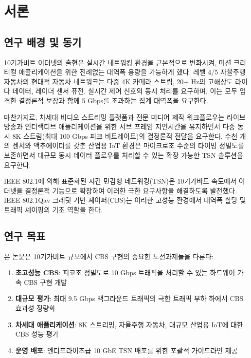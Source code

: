 \documentclass[12pt, a4paper]{article}
\begin{document}
\tableofcontents

\newpage

\section{서론}

\subsection{연구 배경 및 동기}

10기가비트 이더넷의 출현은 실시간 네트워킹 환경을 근본적으로 변화시켜, 미션 크리티컬 애플리케이션을 위한 전례없는 대역폭 용량을 가능하게 했다. 레벨 4/5 자율주행 자동차의 현대적 자동차 네트워크는 다중 4K 카메라 스트림, 20+ Hz의 고해상도 라이다 데이터, 레이더 센서 퓨전, 실시간 제어 신호의 동시 처리를 요구하며, 이는 모두 엄격한 결정론적 보장과 함께 5 Gbps를 초과하는 집계 대역폭을 요구한다.

마찬가지로, 차세대 비디오 스트리밍 플랫폼과 전문 미디어 제작 워크플로우는 라이브 방송과 인터랙티브 애플리케이션을 위한 서브 프레임 지연시간을 유지하면서 다중 동시 8K 스트림(최대 100 Gbps 피크 비트레이트)의 결정론적 전달을 요구한다. 수천 개의 센서와 액추에이터를 갖춘 산업용 IoT 환경은 마이크로초 수준의 타이밍 정밀도를 보존하면서 대규모 동시 데이터 플로우를 처리할 수 있는 확장 가능한 TSN 솔루션을 요구한다.

IEEE 802.1에 의해 표준화된 시간 민감형 네트워킹(TSN)은 10기가비트 속도에서 이더넷을 결정론적 기능으로 확장하여 이러한 극한 요구사항을 해결하도록 발전했다. IEEE 802.1Qav 크레딧 기반 셰이퍼(CBS)는 이러한 고성능 환경에서 대역폭 할당 및 트래픽 셰이핑의 기초 역할을 한다.

\subsection{연구 목표}

본 논문은 10기가비트 규모에서 CBS 구현의 중요한 도전과제들을 다룬다:

\begin{enumerate}
    \item \textbf{초고성능 CBS}: 피코초 정밀도로 10 Gbps 트래픽을 처리할 수 있는 하드웨어 가속 CBS 구현 개발
    \item \textbf{대규모 평가}: 최대 9.5 Gbps 백그라운드 트래픽의 극한 트래픽 부하 하에서 CBS 효과성 정량화
    \item \textbf{차세대 애플리케이션}: 8K 스트리밍, 자율주행 자동차, 대규모 산업용 IoT에 대한 CBS 성능 평가
    \item \textbf{운영 배포}: 엔터프라이즈급 10 GbE TSN 배포를 위한 포괄적 가이드라인 제공
\end{enumerate}
\end{document}
